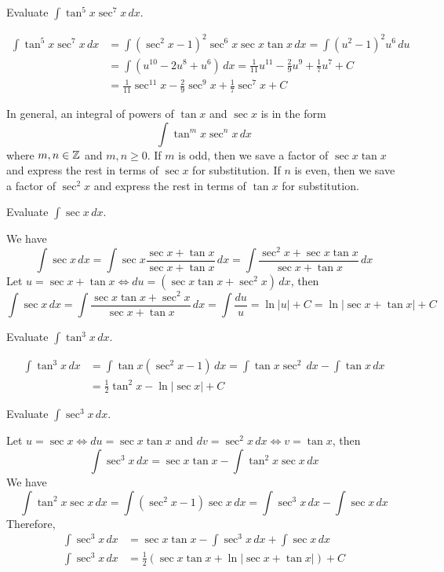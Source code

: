 \begin{problem}
    Evaluate \(\displaystyle{\int\tan^5 x\sec^7 x\,dx}\).
\end{problem}
\begin{solution}
    \begin{align*}
        \int\tan^5 x\sec^7 x\,dx
        &= \int(\sec^2 x-1)^2\sec^6 x\sec x\tan x\,dx
        =\int(u^2-1)^2u^6\,du \\
        &= \int(u^{10}-2u^8+u^6)\,dx
        =\frac{1}{11}u^{11}-\frac{2}{9}u^9+\frac{1}{7}u^7+C \\
        &= \frac{1}{11}\sec^{11}x-\frac{2}{9}\sec^9 x+\frac{1}{7}\sec^7 x
        +C
    \end{align*}
\end{solution}
In general, an integral of powers of \(\tan x\) and \(\sec x\) is in the
form
\[\int\tan^m x\sec^n x\,dx\]
where \(m,n\in\mathbb{Z}\) and \(m,n\geq 0\).
If \(m\) is odd, then we save a factor of \(\sec x\tan x\) and express the
rest in terms of \(\sec x\) for substitution.
If \(n\) is even, then we save a factor of \(\sec^2 x\) and express the
rest in terms of \(\tan x\) for substitution.
\begin{problem}
    Evaluate \(\displaystyle{\int\sec x\,dx}\).
\end{problem}
\begin{solution}
    We have
    \[\int\sec x\,dx=\int\sec x\frac{\sec x+\tan x}{\sec x+\tan x}\,dx
    =\int\frac{\sec^2 x+\sec x\tan x}{\sec x+\tan x}\,dx\]
    Let \(u=\sec x+\tan x\iff du=(\sec x\tan x+\sec^2 x)\,dx\), then
    \[\int\sec x\,dx=\int\frac{\sec x\tan x+\sec^2 x}{\sec x+\tan x}\,dx
    =\int\frac{du}{u}=\ln|u|+C=\ln|\sec x+\tan x|+C\]
\end{solution}
\begin{problem}
    Evaluate \(\displaystyle{\int\tan^3 x\,dx}\).
\end{problem}
\begin{solution}
    \begin{align*}
    \int\tan^3 x\,dx &= \int\tan x(\sec^2x-1)\,dx
    =\int\tan x\sec^2\,dx-\int\tan x\,dx \\
    &= \frac{1}{2}\tan^2 x-\ln|\sec x|+C
    \end{align*}
\end{solution}
\begin{problem}
    Evaluate \(\displaystyle{\int\sec^3 x\,dx}\).
\end{problem}
\begin{solution}
    Let \(u=\sec x\iff du=\sec x\tan x\) and \(dv=\sec^2 x\,dx\iff v=\tan x\),
    then
    \[\int\sec^3 x\,dx=\sec x\tan x-\int\tan^2 x\sec x\,dx\]
    We have
    \[\int\tan^2 x\sec x\,dx=\int(\sec^2 x-1)\sec x\,dx
    =\int\sec^3 x\,dx-\int\sec x\,dx\]
    Therefore,
    \begin{align*}
        \int\sec^3 x\,dx &= \sec x\tan x-\int\sec^3 x\,dx+\int\sec x\,dx \\
        \int\sec^3 x\,dx
        &= \frac{1}{2}(\sec x\tan x+\ln|\sec x+\tan x|)+C
    \end{align*}
\end{solution}

